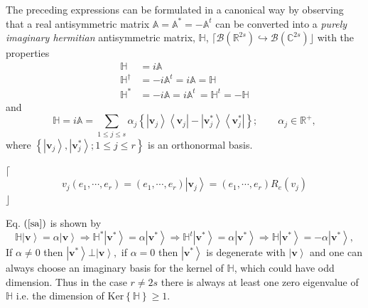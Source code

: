 \documentclass[aps,preprint]{revtex4}%
\begin{document}
The preceding expressions can be formulated in a canonical way by observing
that a real antisymmetric\emph{ }matrix $\mathbb{A}=\mathbb{A}^{\ast
}=-\mathbb{A}^{t}$ can be converted into a \emph{purely imaginary hermitian}
\emph{ }antisymmetric matrix, $\mathbb{H}$, $\lceil\mathcal{B}\left(
\mathbb{R}^{2s}\right)  \hookrightarrow\mathcal{B}\left(  \mathbb{C}%
^{2s}\right)  \rfloor$ with the properties
\begin{align}
\mathbb{H}  &  =i\mathbb{A}\nonumber\\
\mathbb{H}^{\dagger}  &  =-i\mathbb{A}^{t}=i\mathbb{A}=\mathbb{H}\nonumber\\
\mathbb{H}^{\ast}  &  =-i\mathbb{A}=i\mathbb{A}^{t}\,=\mathbb{H}%
^{t}=-\mathbb{H}%
\end{align}
and
\begin{equation}
\mathbb{H}=i\mathbb{A}=\sum_{1\leq j\leq s}\alpha_{j}\left\{  \left\vert
\mathbf{v}_{j}\right\rangle \left\langle \mathbf{v}_{j}\right\vert -\left\vert
\mathbf{v}_{j}^{\ast}\right\rangle \left\langle \mathbf{v}_{j}^{\ast
}\right\vert \right\}  ;\qquad\alpha_{j}\in\mathbb{R}^{+}, \label{sa}%
\end{equation}
where $\left\{  \left\vert \mathbf{v}_{j}\right\rangle ,\left\vert
\mathbf{v}_{j}^{\ast}\right\rangle ;1\leq j\leq r\right\}  $ is an orthonormal basis.

$\lceil$%
\begin{equation}
v_{j}\left(  e_{1},\cdots,e_{r}\right)  =\left(  e_{1},\cdots,e_{r}\right)
\left\vert \mathbf{v}_{j}\right\rangle =\left(  e_{1},\cdots,e_{r}\right)
R_{e}\left(  v_{j}\right)
\end{equation}
$\rfloor$

Eq. $\left(  \ref{sa}\right)  $ is shown by
\begin{equation}
\mathbb{H}\left\vert \mathbf{v}\right\rangle =\alpha\left\vert \mathbf{v}%
\right\rangle \Rightarrow\mathbb{H}^{\ast}\left\vert \mathbf{v}^{\ast
}\right\rangle =\alpha\left\vert \mathbf{v}^{\ast}\right\rangle \Rightarrow
\mathbb{H}^{t}\left\vert \mathbf{v}^{\ast}\right\rangle =\alpha\left\vert
\mathbf{v}^{\ast}\right\rangle \Rightarrow\mathbb{H}\left\vert \mathbf{v}%
^{\ast}\right\rangle =-\alpha\left\vert \mathbf{v}^{\ast}\right\rangle ,
\end{equation}
If $\alpha\neq0$ then $\left\vert \mathbf{v}^{\ast}\right\rangle
\bot\left\vert \mathbf{v}\right\rangle ,$ if $\alpha=0$ then $\left\vert
\mathbf{v}^{\ast}\right\rangle $ is degenerate with $\left\vert \mathbf{v}%
\right\rangle $ and one can always choose an imaginary basis for the kernel of
$\mathbb{H}$, which could have odd dimension. Thus in the case $r\neq2s$ there
is always at least one zero eigenvalue of $\mathbb{H}$ i.e. the dimension of
Ker$\left\{  \mathbb{H}\right\}  \geq1.$
\end{document}
